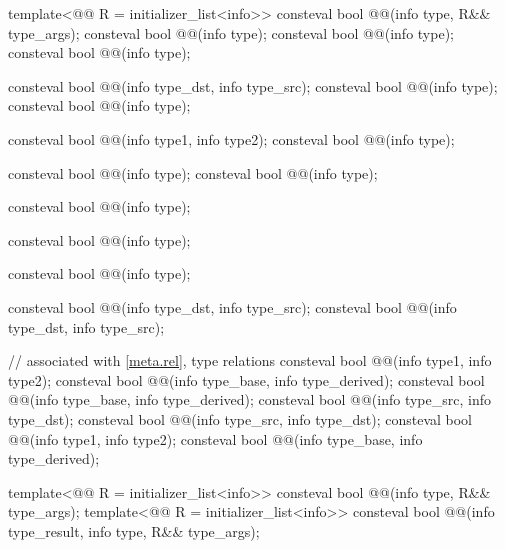 \begin{codeblock}
template<@@ R = initializer_list<info>>
  consteval bool @@(info type, R&& type_args);
consteval bool @@(info type);
consteval bool @@(info type);
consteval bool @@(info type);

consteval bool @@(info type_dst, info type_src);
consteval bool @@(info type);
consteval bool @@(info type);

consteval bool @@(info type1, info type2);
consteval bool @@(info type);

consteval bool @@(info type);
consteval bool @@(info type);

consteval bool @@(info type);

consteval bool @@(info type);

consteval bool @@(info type);

consteval bool @@(info type_dst, info type_src);
consteval bool @@(info type_dst, info type_src);

// associated with \ref{meta.rel}, type relations
consteval bool @@(info type1, info type2);
consteval bool @@(info type_base, info type_derived);
consteval bool @@(info type_base, info type_derived);
consteval bool @@(info type_src, info type_dst);
consteval bool @@(info type_src, info type_dst);
consteval bool @@(info type1, info type2);
consteval bool @@(info type_base, info type_derived);

template<@@ R = initializer_list<info>>
  consteval bool @@(info type, R&& type_args);
template<@@ R = initializer_list<info>>
  consteval bool @@(info type_result, info type, R&& type_args);


\end{codeblock}
